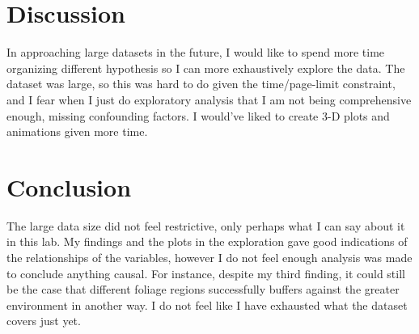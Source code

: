 \documentclass[english]{article}\usepackage[]{graphicx}\usepackage[]{color}
\begin{document}
\section{Discussion}

In approaching large datasets in the future, I would like to spend more time organizing different hypothesis so I can more exhaustively explore the data.  The dataset was large, so this was hard to do given the time/page-limit constraint, and I fear when I just do exploratory analysis that I am not being comprehensive enough, missing confounding factors.  I would've liked to create 3-D plots and animations given more time.   

\section{Conclusion}

The large data size did not feel restrictive, only perhaps what I can say about it in this lab. My findings and the plots in the exploration gave good indications of the relationships of the variables, however I do not feel enough analysis was made to conclude anything causal.  For instance, despite my third finding, it could still be the case that different foliage regions successfully buffers against the greater environment in another way.  I do not feel like I have exhausted what the dataset covers just yet.  
\end{document}
